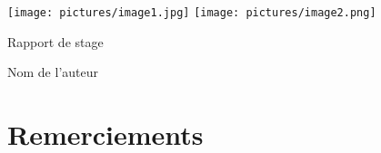 \documentclass[12pt]{report}
\begin{document}
\begin{titlepage}
\parindent=0pt
\texttt{[image: pictures/image1.jpg]} 
\texttt{[image: pictures/image2.png]}

\begin{center}
    Rapport de stage 
\end{center}

\begin{center}
Nom de l'auteur
\end{center}

\end{titlepage}


\chapter*{Remerciements}
\end{document}

